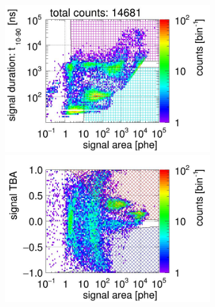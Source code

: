 \begin{landscape}%
	\begin{figure}[!p]
		\centering
		\begin{subfigure}[t]{0.32\textwidth} %
			\centering
			\includegraphics[width=\figurewidth,clip,trim={0 98 0 15}]{Figures/GasTest/CutsValid/res64767/pdpa22Vecfig64767.jpg}
			\includegraphics[width=\figurewidth,clip,trim={0 8 0 40}]{Figures/GasTest/CutsValid/res64767/tbapa22Vecfig64767.jpg}
			\caption{}
			\label{fig:signal selection dv 12 01}
		\end{subfigure}
		\begin{subfigure}[t]{0.32\textwidth}
			\centering

\end{subfigure}
\end{figure}
\end{landscape}
